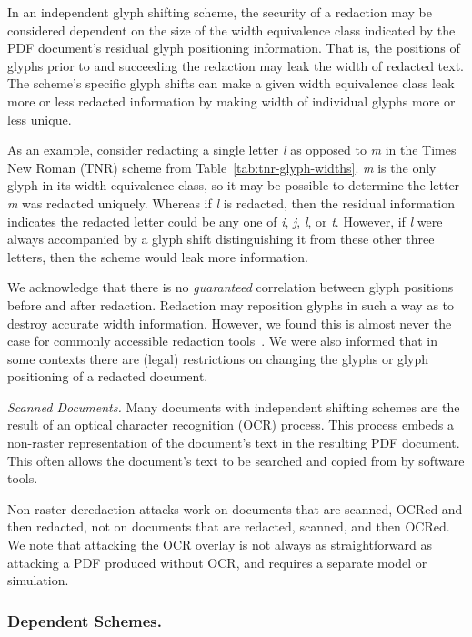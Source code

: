 In an independent glyph shifting scheme, the security of a redaction may be considered dependent on the size of the width equivalence class indicated by the PDF document's residual glyph positioning information.
That is, the positions of glyphs prior to and succeeding the redaction may leak the width of redacted text.
The scheme's specific glyph shifts can make a given width equivalence class leak more or less redacted information by making width of individual glyphs more or less unique.

As an example, consider redacting a single letter \emph{l} as opposed to \emph{m} in the Times New Roman (TNR) scheme from Table~\ref{tab:tnr-glyph-widths}.
\emph{m} is the only glyph in its width equivalence class, so it may be possible to determine the letter \emph{m} was redacted uniquely.
Whereas if \emph{l} is redacted, then the residual information indicates the redacted letter could be any one of \emph{i}, \emph{j}, \emph{l}, or \emph{t}.
However, if \emph{l} were always accompanied by a glyph shift distinguishing it from these other three letters, then the scheme would leak more information.

We acknowledge that there is no \emph{guaranteed} correlation between glyph positions before and after redaction.
Redaction may reposition glyphs in such a way as to destroy accurate width information.
However, we found this is almost never the case for commonly accessible redaction tools~\cite{bland2023story}.
We were also informed that in some contexts there are (legal) restrictions on changing the glyphs or glyph positioning of a redacted document.

\emph{Scanned Documents.}
Many documents with independent shifting schemes are the result of an optical character recognition (OCR) process.
This process embeds a non-raster representation of the document's text in the resulting PDF document.
This often allows the document's text to be searched and copied from by software tools.

Non-raster deredaction attacks work on documents that are scanned, OCRed and then redacted, not on documents that are redacted, scanned, and then OCRed.
We note that attacking the OCR overlay is not always as straightforward as attacking a PDF produced without OCR, and requires a separate model or simulation.

\subsubsection{Dependent Schemes.}
\label{sec:ms-word}


